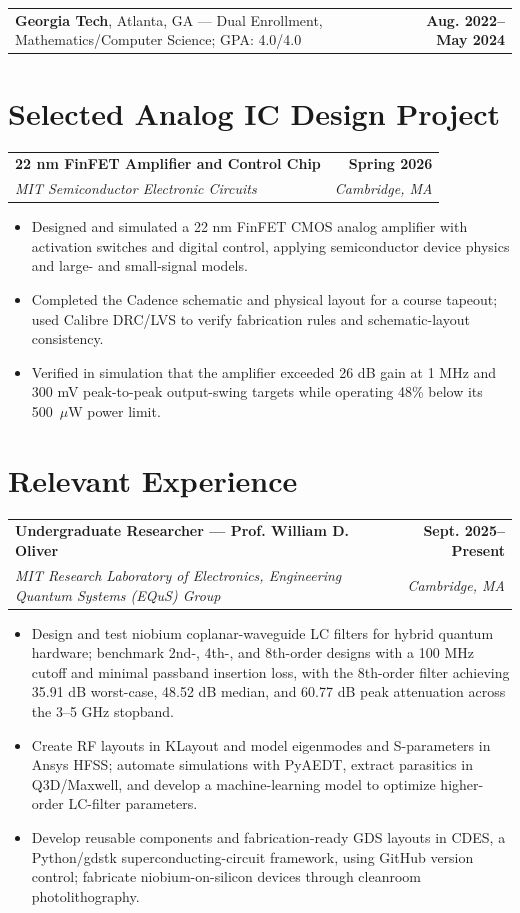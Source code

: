 \documentclass[10pt,letterpaper]{article}
\makeatletter
\newcommand{\role}[4]{%
  \begin{tabularx}{\textwidth}{@{}Xr@{}}
    \textbf{#1} & \textbf{#2} \\
    \textit{#3} & \textit{#4}
  \end{tabularx}\vspace{-4pt}
}
\makeatother
\begin{document}
\vspace{2pt}
\begin{tabularx}{\textwidth}{@{}Xr@{}}
  \textbf{Georgia Tech}, Atlanta, GA --- Dual Enrollment, Mathematics/Computer Science; GPA: 4.0/4.0 & \textbf{Aug. 2022--May 2024}
\end{tabularx}

\section{Selected Analog IC Design Project}
\role{22 nm FinFET Amplifier and Control Chip}{Spring 2026}{MIT Semiconductor Electronic Circuits}{Cambridge, MA}
\begin{itemize}
  \item Designed and simulated a 22 nm FinFET CMOS analog amplifier with activation switches and digital control, applying semiconductor device physics and large- and small-signal models.
  \item Completed the Cadence schematic and physical layout for a course tapeout; used Calibre DRC/LVS to verify fabrication rules and schematic-layout consistency.
  \item Verified in simulation that the amplifier exceeded 26 dB gain at 1 MHz and 300 mV peak-to-peak output-swing targets while operating 48\% below its 500~$\mu$W power limit.
\end{itemize}

\section{Relevant Experience}
\role{Undergraduate Researcher --- Prof. William D. Oliver}{Sept. 2025--Present}{MIT Research Laboratory of Electronics, Engineering Quantum Systems (EQuS) Group}{Cambridge, MA}
\begin{itemize}
  \item Design and test niobium coplanar-waveguide LC filters for hybrid quantum hardware; benchmark 2nd-, 4th-, and 8th-order designs with a 100 MHz cutoff and minimal passband insertion loss, with the 8th-order filter achieving 35.91 dB worst-case, 48.52 dB median, and 60.77 dB peak attenuation across the 3--5 GHz stopband.
  \item Create RF layouts in KLayout and model eigenmodes and S-parameters in Ansys HFSS; automate simulations with PyAEDT, extract parasitics in Q3D/Maxwell, and develop a machine-learning model to optimize higher-order LC-filter parameters.
  \item Develop reusable components and fabrication-ready GDS layouts in CDES, a Python/gdstk superconducting-circuit framework, using GitHub version control; fabricate niobium-on-silicon devices through cleanroom photolithography.
\end{itemize}
\end{document}

